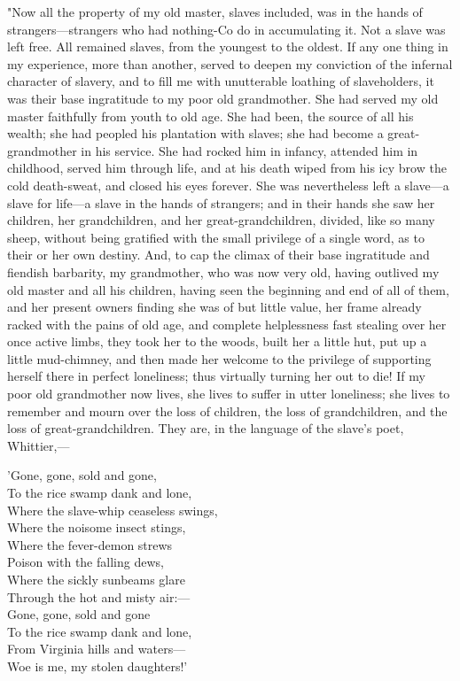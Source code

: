 "Now all the property of my old master, slaves included, {}was in the
hands of strangers---strangers who had nothing-Co do in accumulating it.
Not a slave was left free. All remained slaves, from the youngest to the
oldest. If any one thing in my experience, more than another, served to
deepen my conviction of the infernal character of slavery, and to fill
me with unutterable loathing of slaveholders, it was their base
ingratitude to my poor old grandmother. She had served my old master
faithfully from youth to old age. She had been, the source of all his
wealth; she had peopled his plantation with slaves; she had become a
great-grandmother in his service. She had rocked him in infancy,
attended him in childhood, served him through life, and at his death
wiped from his icy brow the cold death-sweat, and closed his eyes
forever. She was nevertheless left a slave---a slave for life---a slave
in the hands of strangers; and in their hands she saw her children, her
grandchildren, and her great-grandchildren, divided, like so many sheep,
without being gratified with the small privilege of a single word, as to
their or her own destiny. And, to cap the climax of their base
ingratitude and fiendish barbarity, my grandmother, who was now very
old, having outlived my old master and all his children, having seen the
beginning and end of all of them, and her present owners finding she was
of but little value, her frame already racked with the pains of old age,
and complete helplessness fast stealing over her once active limbs, they
took her to the woods, built her a little hut, put up a little
mud-chimney, and then made her welcome to the privilege of supporting
herself there in perfect loneliness; thus virtually turning her out to
die! If my poor old grandmother now lives, she lives to suffer in utter
loneliness; she lives to remember and mourn over the loss of children,
the loss of grandchildren, and the loss of great-grandchildren. They
are, in the language of the slave's poet, Whittier,---

{}

{{'}Gone, gone, sold and gone,\\
To the rice swamp dank and lone,\\
Where the slave-whip ceaseless swings,\\
Where the noisome insect stings,\\
Where the fever-demon strews\\
Poison with the falling dews,\\
Where the sickly sunbeams glare\\
Through the hot and misty air:---\\
{Gone, gone, sold and gone}\\
{To the rice swamp dank and lone,}\\
{From Virginia hills and waters---}\\
{Woe is me, my stolen daughters!'}}

